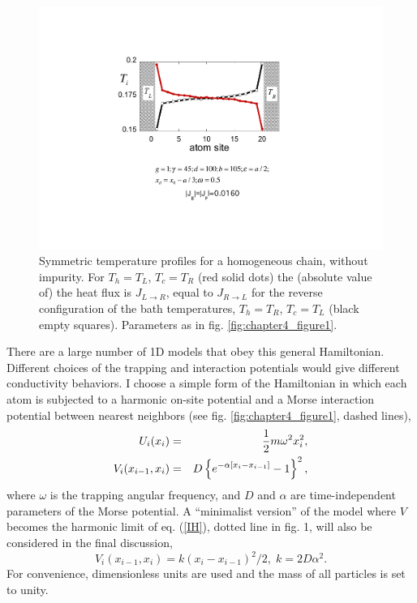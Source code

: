 \begin{figure}
\centering
\includegraphics[width=0.65\linewidth]{Figures/FIG2.pdf}
\caption{Symmetric temperature profiles for a homogeneous chain, without impurity.  For $T_{h}=T_{L}$, $T_c=T_R$ (red solid dots) the (absolute value of) the heat flux is $J_{L\rightarrow R}$, equal to $J_{R\rightarrow L}$ for the reverse configuration of the bath temperatures, $T_{h}=T_{R}$, $T_c=T_L$
(black empty squares). Parameters as in fig. \ref{fig:chapter4_figure1}.}
\label{fig:chapter4_figure2}
\end{figure}

There are a large number of 1D models that obey this general Hamiltonian. Different choices of the trapping and interaction potentials would give different conductivity behaviors. I choose a simple form of the Hamiltonian in which each atom is subjected to a harmonic on-site potential and a Morse interaction potential between nearest neighbors (see fig. \ref{fig:chapter4_figure1}, dashed lines),
%
\begin{eqnarray}
\label{HO}
U_i(x_i)&=&{1 \over 2} m \omega^2 x^2_i,
\\
\label{IH}
V_i(x_{i-1},x_i)&=&D\left \{e^{-\alpha [x_i-x_{i-1}]}-1\right \}^2,
\end{eqnarray}
%
where $\omega$ is the trapping angular frequency, and $D$ and $\alpha$ are time-independent parameters of the Morse potential.
A ``minimalist version'' of the model where $V$ becomes the harmonic limit of eq. (\ref{IH}), dotted line in fig. 1,
 will also be considered in the final discussion,
%
\begin{equation}
\label{Vhar}
{V}_i(x_{i-1},x_i)=k(x_i-x_{i-1})^2/2,\;k=2D\alpha^2.
\end{equation}
%
For convenience, dimensionless units are used and the mass of all particles is set to unity.

